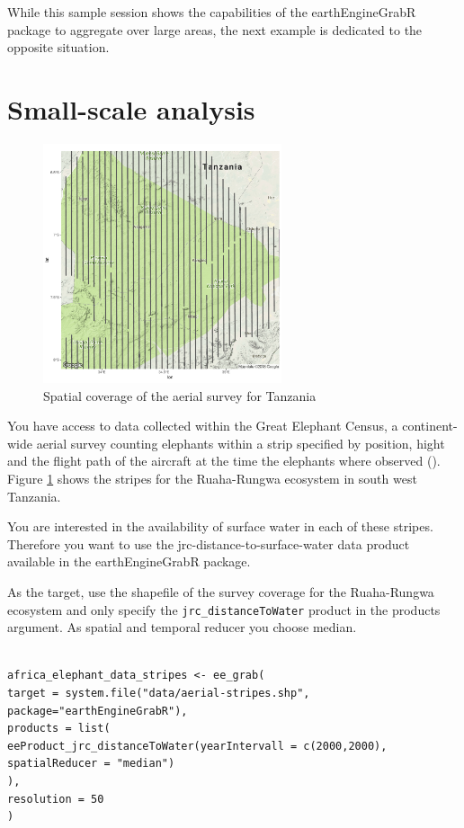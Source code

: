 While this sample session shows the capabilities of the earthEngineGrabR package to aggregate over large areas, the next example is dedicated to the opposite situation. 

\section{Small-scale analysis}




\begin{figure}
	\begin{center}
		\includegraphics[width=7cm]{images/stripes-cropped.pdf}
		\caption{Spatial coverage of the aerial survey for Tanzania}
		\label{stripes}
	\end{center}
\end{figure}

You have access to data collected within the Great Elephant Census, a continent-wide aerial survey counting  elephants within a strip specified by position, hight and the flight path of the aircraft at the time the elephants where observed (\cite{beale2017spatial}). Figure \ref{stripes} shows the stripes for the Ruaha-Rungwa ecosystem in south west Tanzania.


You are interested in the availability of surface water in each of these stripes. Therefore you want to use the jrc-distance-to-surface-water data product available in the earthEngineGrabR package. 

As the target, use the shapefile of the survey coverage for the Ruaha-Rungwa ecosystem and only specify the \texttt{jrc\_distanceToWater} product in the products argument. As spatial and temporal reducer you choose median. 

\begin{lstlisting}

africa_elephant_data_stripes <- ee_grab(
target = system.file("data/aerial-stripes.shp", package="earthEngineGrabR"), 
products = list(
eeProduct_jrc_distanceToWater(yearIntervall = c(2000,2000), spatialReducer = "median")
),
resolution = 50
)
\end{lstlisting}


